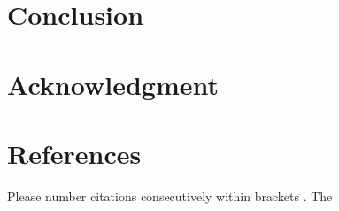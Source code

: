 \documentclass[conference]{IEEEtran}
\begin{document}

\section{Conclusion}


\section*{Acknowledgment}


\section*{References}

Please number citations consecutively within brackets \cite{IEEEhowto:IEEEtranpage}. The 






\end{document}
